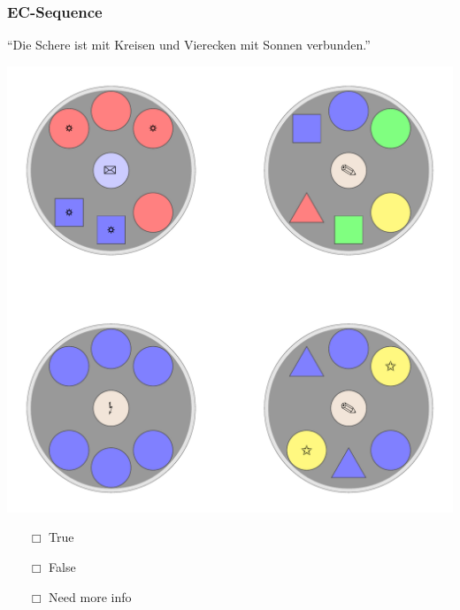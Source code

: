 \documentclass[fleqn,10pt,serif,xcolor=dvipsnames]{beamer}
\newcommand{\EC}{EC}
\newcommand{\mymark}[1]{{\color{blue}{#1}}}
\begin{document}
\begin{frame}
  \frametitle{\EC-Sequence}
  \begin{center}
    ``Die Schere ist mit Kreisen und Vierecken mit Sonnen verbunden.''

    \vspace{0.1cm}

    \includegraphics[width=0.5 \textwidth]{../../pictures/ec_01_1.pdf}

    \vspace{0.1cm}

    \begin{multicols}{3}
      \begin{itemize} 
      \item[$\Box$] True\\
        \onslide<2>{$\leadsto$  \mymark{false}}
      \item[$\Box$] False\\
        \onslide<2>{$\leadsto$ \mymark{false}}
      \item[$\Box$] Need more info 
      \end{itemize}
    \end{multicols}

  \end{center}
\end{frame}
\end{document}
